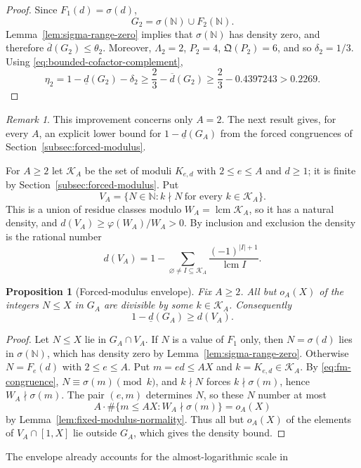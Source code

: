 \documentclass[11pt]{article}
\newtheorem{proposition}[theorem]{Proposition}
\theoremstyle{remark}
\newtheorem{remark}[theorem]{Remark}
\newcommand{\N}{\mathbb N}
\newcommand{\1}{\mathbf 1}
\newcommand{\lowerdens}{\underline d}
\newcommand{\upperdens}{\overline d}
\DeclareMathOperator{\lcm}{lcm}
\begin{document}
\begin{proof}
Since $F_1(d)=\sigma(d)$,
\[
 G_2=\sigma(\N)\cup F_2(\N).
\]
Lemma~\ref{lem:sigma-range-zero} implies that $\sigma(\N)$ has density
zero, and therefore $\upperdens(G_2)\leq\theta_2$.  Moreover,
$\Lambda_2=2$, $P_2=4$, $\mathfrak Q(P_2)=6$, and so $\delta_2=1/3$.
Using \eqref{eq:bounded-cofactor-complement},
\[
 \eta_2
 =1-\lowerdens(G_2)-\delta_2
 \geq\frac23-\upperdens(G_2)
 \geq\frac23-0.4397243>0.2269.
\]
\end{proof}

\begin{remark}
This improvement concerns only $A=2$.  The next result gives, for every
$A$, an explicit lower bound for $1-\lowerdens(G_A)$ from the forced
congruences of Section~\ref{subsec:forced-modulus}.
\end{remark}
For $A\geq2$ let $\mathcal K_A$ be the set of moduli $K_{e,d}$ with
$2\leq e\leq A$ and $d\geq1$; it is finite by
Section~\ref{subsec:forced-modulus}.  Put
\[
 V_A=\{N\in\N:k\nmid N\ \text{for every }k\in\mathcal K_A\} .
\]
This is a union of residue classes modulo $W_A=\lcm\mathcal K_A$, so it has
a natural density, and $d(V_A)\geq\varphi(W_A)/W_A>0$.  By inclusion and
exclusion the density is the rational number
\begin{equation}\label{eq:fm-ie}
 d(V_A)=1-\sum_{\varnothing\neq I\subseteq\mathcal K_A}
 \frac{(-1)^{|I|+1}}{\lcm I} .
\end{equation}
\begin{proposition}[Forced-modulus envelope]\label{prop:fm-envelope}
Fix $A\geq2$.  All but $o_A(X)$ of the integers $N\leq X$ in $G_A$ are
divisible by some $k\in\mathcal K_A$.  Consequently
\[
 1-\lowerdens(G_A)\geq d(V_A) .
\]
\end{proposition}
\begin{proof}
Let $N\leq X$ lie in $G_A\cap V_A$.  If $N$ is a value of $F_1$ only, then
$N=\sigma(d)$ lies in $\sigma(\N)$, which has density zero by
Lemma~\ref{lem:sigma-range-zero}.  Otherwise $N=F_e(d)$ with
$2\leq e\leq A$.  Put $m=ed\leq AX$ and $k=K_{e,d}\in\mathcal K_A$.  By
\eqref{eq:fm-congruence}, $N\equiv\sigma(m)\pmod k$, and $k\nmid N$ forces
$k\nmid\sigma(m)$, hence $W_A\nmid\sigma(m)$.  The pair $(e,m)$ determines
$N$, so these $N$ number at most
\[
 A\cdot\#\{m\leq AX:W_A\nmid\sigma(m)\}=o_A(X)
\]
by Lemma~\ref{lem:fixed-modulus-normality}.  Thus all but $o_A(X)$ of the
elements of $V_A\cap[1,X]$ lie outside $G_A$, which gives the density
bound.
\end{proof}
The envelope already accounts for the almost-logarithmic scale in
\end{document}
